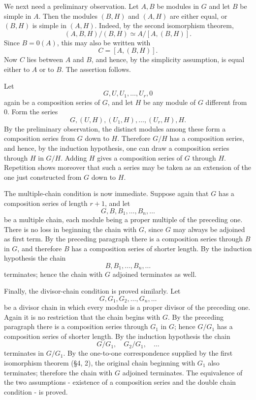 \documentclass[
  12pt,
]{article}
\begin{document}
We next need a preliminary observation. Let \(A,B\) be modules in \(G\)
and let \(B\) be simple in \(A\). Then the modules \((B,H)\) and
\((A,H)\) are either equal, or \((B,H)\) is simple in \((A,H)\). Indeed,
by the second isomorphism theorem, \[
  (A,B,H)/(B,H) \simeq A/[A,(B,H)].
\] Since \(B=0(A)\), this may also be written with \[
  C=[A,(B,H)].
\] Now \(C\) lies between \(A\) and \(B\), and hence, by the simplicity
assumption, is equal either to \(A\) or to \(B\). The assertion follows.

Let \[
  G,U,U_1,
\ldots,U_r,0
\] again be a composition series of \(G\), and let \(H\) be any module
of \(G\) different from \(0\). Form the series \[
  G,(U,H),(U_1,H),
\ldots,(U_r,H),H.
\] By the preliminary observation, the distinct modules among these form
a composition series from \(G\) down to \(H\). Therefore \(G/H\) has a
composition series, and hence, by the induction hypothesis, one can draw
a composition series through \(H\) in \(G/H\). Adding \(H\) gives a
composition series of \(G\) through \(H\). Repetition shows moreover
that such a series may be taken as an extension of the one just
constructed from \(G\) down to \(H\).

The multiple-chain condition is now immediate. Suppose again that \(G\)
has a composition series of length \(r+1\), and let \[
  G,B,B_1,
\ldots,B_n,
\ldots
\] be a multiple chain, each module being a proper multiple of the
preceding one. There is no loss in beginning the chain with \(G\), since
\(G\) may always be adjoined as first term. By the preceding paragraph
there is a composition series through \(B\) in \(G\), and therefore
\(B\) has a composition series of shorter length. By the induction
hypothesis the chain \[
  B,B_1,
\ldots,B_n,
\ldots
\] terminates; hence the chain with \(G\) adjoined terminates as well.

Finally, the divisor-chain condition is proved similarly. Let \[
  G,G_1,G_2,
\ldots,G_n,
\ldots
\] be a divisor chain in which every module is a proper divisor of the
preceding one. Again it is no restriction that the chain begins with
\(G\). By the preceding paragraph there is a composition series through
\(G_1\) in \(G\); hence \(G/G_1\) has a composition series of shorter
length. By the induction hypothesis the chain \[
  G/G_1,
  \quad G_2/G_1,
  \quad \ldots
\] terminates in \(G/G_1\). By the one-to-one correspondence supplied by
the first isomorphism theorem (§4, 2), the original chain beginning with
\(G_1\) also terminates; therefore the chain with \(G\) adjoined
terminates. The equivalence of the two assumptions - existence of a
composition series and the double chain condition - is proved.
\end{document}
